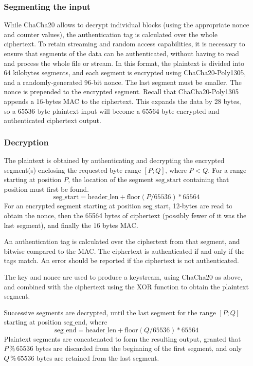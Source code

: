\subsubsection{Segmenting the input}
%
While ChaCha20 allows to decrypt individual blocks (using the appropriate nonce and counter values), the authentication tag is calculated over the whole ciphertext.
%
To retain streaming and random access capabilities, it is necessary to ensure that segments of the data can be authenticated, without having to read and process the whole file or stream.
%
In this format, the plaintext is divided into 64 kilobytes segments, and each segment is encrypted using ChaCha20-Poly1305, and a randomly-generated 96-bit nonce. The last segment must be smaller.
%
The nonce is prepended to the encrypted segment. Recall that ChaCha20-Poly1305 appends a 16-bytes MAC to the ciphertext.
%
This expands the data by 28 bytes, so a 65536 byte plaintext input will become a 65564 byte encrypted and authenticated ciphertext output.

\subsubsection{Decryption}
The plaintext is obtained by authenticating and decrypting the encrypted segment(s) enclosing the requested byte range $[P;Q]$, where $P<Q$.
%
For a range starting at position $P$, the location of the segment $\text{seg\_start}$ containing that position must first be found.
%
$$\text{seg\_start} = \text{header\_len} + \text{floor}(P/65536) * 65564$$
%
For an encrypted segment starting at position $\text{seg\_start}$, 12-bytes are read to obtain the nonce, then the 65564 bytes of ciphertext (possibly fewer of it was the last segment), and finally the 16 bytes MAC.

An authentication tag is calculated over the ciphertext from that segment, and bitwise compared to the MAC. The ciphertext is authenticated if and only if the tags match.
%
An error should be reported if the ciphertext is not authenticated.

The key and nonce are used to produce a keystream, using ChaCha20 as above, and combined with the ciphertext using the XOR function to obtain the plaintext segment.

Successive segments are decrypted, until the last segment for the range $[P;Q]$ starting at position $\text{seg\_end}$, where %
%
$$\text{seg\_end} = \text{header\_len} + \text{floor}(Q/65536) * 65564$$
%
Plaintext segments are concatenated to form the resulting output, granted that $P \mathbin{\%} 65536$ bytes are discarded from the beginning of the first segment, and only $Q \mathbin{\%} 65536$ bytes are retained from the last segment.

